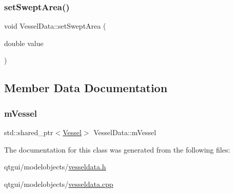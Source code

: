 \mbox{\label{class_vessel_data_a8084326378623668bf88d0ac97ce2f54}} 
\subsubsection{\texorpdfstring{setSweptArea()}{setSweptArea()}}
{\footnotesize\ttfamily void Vessel\+Data\+::set\+Swept\+Area (\begin{DoxyParamCaption}\item[{double}]{value }\end{DoxyParamCaption})}



\subsection{Member Data Documentation}
\mbox{\label{class_vessel_data_acdd044b759445a4d081ac71646e673be}} 
\subsubsection{\texorpdfstring{mVessel}{mVessel}}
{\footnotesize\ttfamily std\+::shared\+\_\+ptr$<$\mbox{\hyperlink{class_vessel}{Vessel}}$>$ Vessel\+Data\+::m\+Vessel}



The documentation for this class was generated from the following files\+:\begin{DoxyCompactItemize}
\item 
qtgui/modelobjects/\mbox{\hyperlink{vesseldata_8h}{vesseldata.\+h}}\item 
qtgui/modelobjects/\mbox{\hyperlink{vesseldata_8cpp}{vesseldata.\+cpp}}\end{DoxyCompactItemize}
